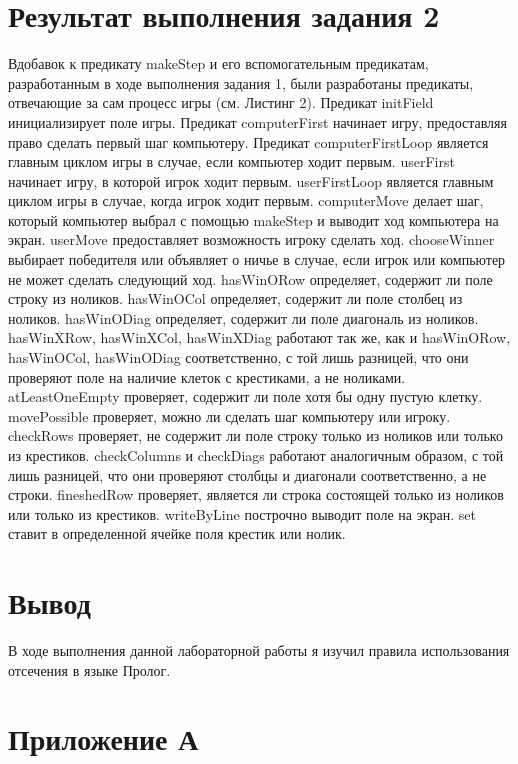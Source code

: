 \documentclass{article}
\begin{document}
\section*{Результат выполнения задания 2}
Вдобавок к предикату makeStep и его вспомогательным предикатам,
разработанным в ходе выполнения задания 1, были разработаны предикаты,
отвечающие за сам процесс игры (см. Листинг 2). Предикат initField инициализирует поле
игры. Предикат computerFirst начинает игру, предоставляя право сделать
первый шаг компьютеру. Предикат computerFirstLoop является главным
циклом игры в случае, если компьютер ходит первым. userFirst начинает
игру, в которой игрок ходит первым. userFirstLoop является главным
циклом игры в случае, когда игрок ходит первым. computerMove делает
шаг, который компьютер выбрал с помощью makeStep и выводит ход
компьютера на экран. userMove предоставляет возможность игроку сделать
ход. chooseWinner выбирает победителя или объявляет о ничье в случае,
если игрок или компьютер не может сделать следующий ход. hasWinORow
определяет, содержит ли поле строку из ноликов. hasWinOCol определяет,
содержит ли поле столбец из ноликов. hasWinODiag определяет, содержит
ли поле диагональ из ноликов. hasWinXRow, hasWinXCol, hasWinXDiag
работают так же, как и hasWinORow, hasWinOCol, hasWinODiag
соответственно, с той лишь разницей, что они проверяют поле на наличие
клеток с крестиками, а не ноликами. atLeastOneEmpty проверяет,
содержит ли поле хотя бы одну пустую клетку. movePossible проверяет,
можно ли сделать шаг компьютеру или игроку. checkRows проверяет, не
содержит ли поле строку только из ноликов или только из
крестиков. checkColumns и checkDiags работают аналогичным образом, с
той лишь разницей, что они проверяют столбцы и диагонали
соответственно, а не строки. fineshedRow проверяет, является ли строка
состоящей только из ноликов или только из крестиков. writeByLine
построчно выводит поле на экран. set ставит в определенной ячейке поля
крестик или нолик.

\section*{Вывод}
В ходе выполнения данной лабораторной работы я изучил правила
использования отсечения в языке Пролог.

\pagebreak
\section*{Приложение А}
\end{document}
